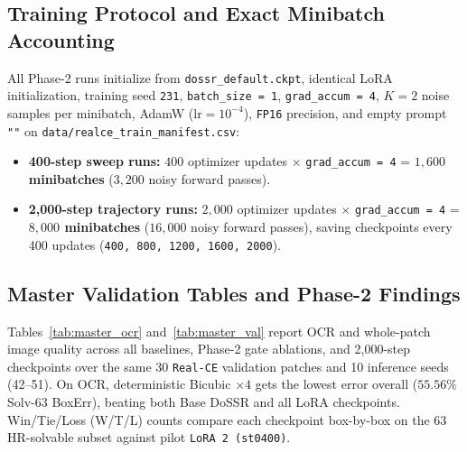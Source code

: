 \documentclass[11pt]{article}
\begin{document}
\subsection{Training Protocol and Exact Minibatch Accounting}
All Phase-2 runs initialize from \texttt{dossr\_default.ckpt}, identical LoRA initialization, training seed \texttt{231}, \texttt{batch\_size = 1}, \texttt{grad\_accum = 4}, $K = 2$ noise samples per minibatch, AdamW ($\text{lr} = 10^{-4}$), \texttt{FP16} precision, and empty prompt \texttt{""} on \texttt{data/realce\_train\_manifest.csv}:
\begin{itemize}
    \item \textbf{400-step sweep runs:} $400$ optimizer updates $\times$ \texttt{grad\_accum = 4} = \textbf{$1{,}600$ minibatches} ($3{,}200$ noisy forward passes).
    \item \textbf{2,000-step trajectory runs:} $2{,}000$ optimizer updates $\times$ \texttt{grad\_accum = 4} = \textbf{$8{,}000$ minibatches} ($16{,}000$ noisy forward passes), saving checkpoints every 400 updates (\texttt{400, 800, 1200, 1600, 2000}).
\end{itemize}

\subsection{Master Validation Tables and Phase-2 Findings}
Tables~\ref{tab:master_ocr} and~\ref{tab:master_val} report OCR and whole-patch image quality across all baselines, Phase-2 gate ablations, and 2,000-step checkpoints over the same 30 \texttt{Real-CE} validation patches and 10 inference seeds (42--51). On OCR, deterministic Bicubic $\times 4$ gets the lowest error overall ($55.56\%$ Solv-63 BoxErr), beating both Base DoSSR and all LoRA checkpoints. Win/Tie/Loss (W/T/L) counts compare each checkpoint box-by-box on the 63 HR-solvable subset against pilot \texttt{LoRA~2 (st0400)}.
\end{document}
